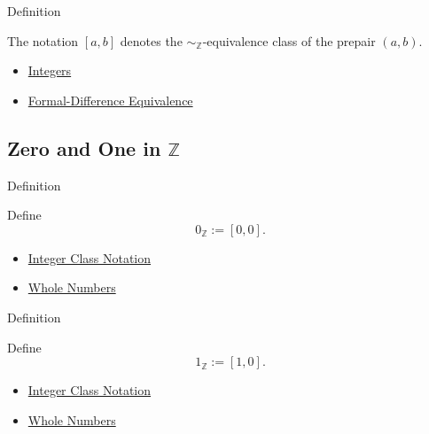 \begin{definitionbox}{Definition}
\begin{definition}
\label{def:integer-class-notation}
The notation $[a,b]$ denotes the $\sim_{\mathbb{Z}}$-equivalence class of the
prepair $(a,b)$.
\end{definition}
\end{definitionbox}

\begin{dependencies}
\begin{itemize}
  \item \hyperref[def:integers]{Integers}
  \item \hyperref[def:formal-difference-equivalence]{Formal-Difference Equivalence}
\end{itemize}
\end{dependencies}

\subsection*{\texorpdfstring{Zero and One in $\mathbb{Z}$}{Zero and One in Z}}

\begin{definitionbox}{Definition}
\begin{definition}
\label{def:zero-in-z}
Define
\[
0_{\mathbb{Z}}:=[0,0].
\]
\end{definition}
\end{definitionbox}

\begin{dependencies}
\begin{itemize}
  \item \hyperref[def:integer-class-notation]{Integer Class Notation}
  \item \hyperref[def:whole-numbers]{Whole Numbers}
\end{itemize}
\end{dependencies}

\begin{definitionbox}{Definition}
\begin{definition}
\label{def:one-in-z}
Define
\[
1_{\mathbb{Z}}:=[1,0].
\]
\end{definition}
\end{definitionbox}

\begin{dependencies}
\begin{itemize}
  \item \hyperref[def:integer-class-notation]{Integer Class Notation}
  \item \hyperref[def:whole-numbers]{Whole Numbers}
\end{itemize}
\end{dependencies}

